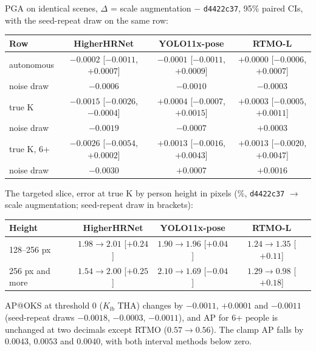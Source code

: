 PGA on identical scenes, $\Delta$ = scale augmentation $-$ \texttt{d4422c37}, 95\% paired CIs, with the seed-repeat draw on the same row:

{\small\setlength{\tabcolsep}{4pt}
\begin{tabular}{lccc}
\hline
\textbf{Row} & \textbf{HigherHRNet} & \textbf{YOLO11x-pose} & \textbf{RTMO-L} \\
\hline
autonomous       & $-0.0002$ [$-0.0011$, $+0.0007$] & $-0.0001$ [$-0.0011$, $+0.0009$] & $+0.0000$ [$-0.0006$, $+0.0007$] \\
\quad noise draw & $-0.0006$ & $-0.0010$ & $-0.0003$ \\
true K           & $-0.0015$ [$-0.0026$, $-0.0004$] & $+0.0004$ [$-0.0007$, $+0.0015$] & $+0.0003$ [$-0.0005$, $+0.0011$] \\
\quad noise draw & $-0.0019$ & $-0.0007$ & $+0.0003$ \\
true K, 6+       & $-0.0026$ [$-0.0054$, $+0.0002$] & $+0.0013$ [$-0.0016$, $+0.0043$] & $+0.0013$ [$-0.0020$, $+0.0047$] \\
\quad noise draw & $-0.0030$ & $+0.0007$ & $+0.0016$ \\
\hline
\end{tabular}
}

\vspace{0.5em}

The targeted slice, error at true K by person height in pixels (\%, \texttt{d4422c37} $\rightarrow$ scale augmentation; seed-repeat draw in brackets):

{\small
\begin{tabular}{lccc}
\hline
\textbf{Height} & \textbf{HigherHRNet} & \textbf{YOLO11x-pose} & \textbf{RTMO-L} \\
\hline
128--256 px      & $1.98 \rightarrow 2.01$ [$+0.24$] & $1.90 \rightarrow 1.96$ [$+0.04$] & $1.24 \rightarrow 1.35$ [$+0.11$] \\
256 px and more  & $1.54 \rightarrow 2.00$ [$+0.25$] & $2.10 \rightarrow 1.69$ [$-0.04$] & $1.29 \rightarrow 0.98$ [$+0.18$] \\
\hline
\end{tabular}
}

\vspace{0.5em}

AP@OKS at threshold 0 ($K_{lb}$ THA) changes by $-0.0011$, $+0.0001$ and $-0.0011$ (seed-repeat draws $-0.0018$, $-0.0003$, $-0.0011$), and AP for 6+ people is unchanged at two decimals except RTMO ($0.57 \rightarrow 0.56$).
The clamp AP falls by $0.0043$, $0.0053$ and $0.0040$, with both interval methods below zero.

